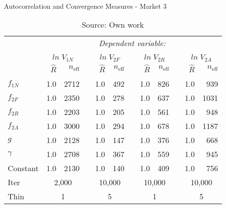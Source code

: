 \begin{table}[ht]
\caption{Autocorrelation and Convergence Measures - Market 3}
\label{mkt3_T_autocorr_convergence_SCOTYORK}
\centering
\begin{tabular}{lrrrrrrrrrrr}
\toprule 
 & \multicolumn{11}{c}{\textit{Dependent variable:}} \\ 
\cline{2-12} 
\\[-1.8ex] & \multicolumn{2}{c}{$ln \; V_{1N}$} & &\multicolumn{2}{c}{$ln \; V_{2F}$} & & \multicolumn{2}{c}{ $ln \; V_{2R}$} & &  \multicolumn{2}{c}{ $ln \; V_{2A}$}\\ 
\cline{2-3} \cline{5-6} \cline{8-9} \cline{11-12}
 & $\hat{R}$ & $n_{\text{eff}}$ & & $\hat{R}$ & $n_{\text{eff}}$  & & $\hat{R}$ & $n_{\text{eff}}$ & & $\hat{R}$ & $n_{\text{eff}}$ \\  
\hline \\[-1.8ex] 
  $f_{1N}$ & 1.0 & 2712 & & 1.0 & 492 & & 1.0 & 826 & & 1.0 & 939 \\
  $f_{2F}$ & 1.0 & 2350 & & 1.0 & 278 & & 1.0 & 637 & & 1.0 & 1031\\
  $f_{2R}$ & 1.0 & 2203 & & 1.0 & 205 & & 1.0 & 561 & & 1.0 & 948 \\
  $f_{2A}$ & 1.0 & 3000 & & 1.0 & 294 & & 1.0 & 678 & & 1.0 & 1187\\
  $g$      & 1.0 & 2128 & & 1.0 & 147 & & 1.0 & 376 & & 1.0 & 668 \\
  $\gamma$ & 1.0 & 2708 & & 1.0 & 367 & & 1.0 & 559 & & 1.0 & 945 \\
  Constant & 1.0 & 2130 & & 1.0 & 140 & & 1.0 & 409 & & 1.0 & 756 \\
   \hline
   Iter   & \multicolumn{2}{c}{2,000} && \multicolumn{2}{c}{10,000} && \multicolumn{2}{c}{10,000} && \multicolumn{2}{c}{10,000} \\
   Thin   & \multicolumn{2}{c}{1} && \multicolumn{2}{c}{5} && \multicolumn{2}{c}{1} && \multicolumn{2}{c}{5} \\
   \bottomrule
\end{tabular}
\caption*{Source: Own work}
\end{table}